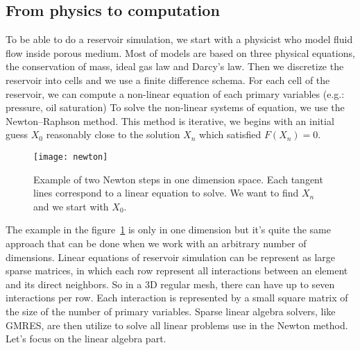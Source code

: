 \subsection{From physics to computation}
To be able to do a reservoir simulation, we start with a physicist who model fluid flow inside porous medium.
%
Most of models are based on three physical equations, the conservation of mass, ideal gas law and Darcy's law.
%
Then we discretize the reservoir into cells and we use a finite difference schema.
%
For each cell of the reservoir, we can compute a non-linear equation of each primary variables (e.g.: pressure, oil saturation)
%
To solve the non-linear systems of equation, we use the Newton–Raphson method.
%
This method is iterative, we begins with an initial guess $X_0$ reasonably close to the solution $X_n$ which satisfied $F(X_n) = 0$.

\begin{figure}[!ht]
  \centering
  \texttt{[image: newton]}
  \caption{Example of two Newton steps in one dimension space.
    Each tangent lines correspond to a linear equation to solve.
    We want to find $X_n$ and we start with $X_0$.}
\label{fig:newton}
\end{figure}

The example in the figure~\ref{fig:newton} is only in one dimension but it's quite the same approach that can be done when we work with an arbitrary number of dimensions.
%
Linear equations of reservoir simulation can be represent as large sparse matrices, in which each row represent all interactions between an element and its direct neighbors.
%
So in a 3D regular mesh, there can have up to seven interactions per row.
%
Each interaction is represented by a small square matrix of the size of the number of primary variables.
%
Sparse linear algebra solvers, like GMRES, are then utilize to solve all linear problems use in the Newton method.
%
Let's focus on the linear algebra part.
